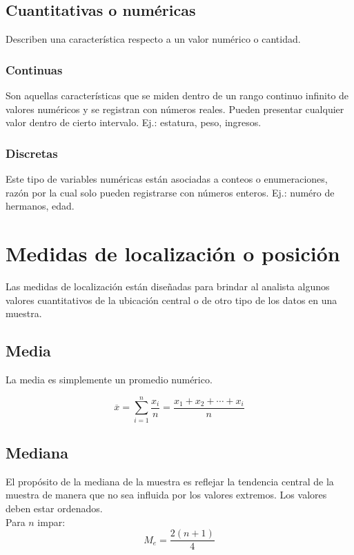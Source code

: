 \documentclass{report}
\begin{document}
      \subsection*{Cuantitativas o numéricas}
        Describen una característica respecto a un valor numérico o cantidad.

        \subsubsection*{Continuas}
          Son aquellas características que se miden dentro de un rango continuo 
          infinito de valores numéricos y se registran con números reales. Pueden 
          presentar cualquier valor dentro de cierto intervalo. Ej.: estatura, 
          peso, ingresos.
        \subsubsection*{Discretas}
          Este tipo de variables numéricas están asociadas a conteos o enumeraciones, 
          razón por la cual solo pueden registrarse con números enteros. Ej.: numéro
          de hermanos, edad.
    \section*{Medidas de localización o posición}
      Las medidas de localización están diseñadas para brindar al analista algunos 
      valores cuantitativos de la ubicación central o de otro tipo de los datos en una 
      muestra.
      
      \subsection*{Media}
        La media es simplemente un promedio numérico.

        \begin{equation*}
          \overline{x}=\sum_{i = 1}^n\frac{x_i}{n}=\frac{x_1+x_2+\dotsm+x_i}{n}
        \end{equation*}

        \subsection*{Mediana}
          El propósito de la mediana de la muestra es reflejar la tendencia central 
          de la muestra de manera que no sea influida por los valores extremos. Los
          valores deben estar ordenados.\\
          \indent Para $n$ impar:
          \begin{equation*}
            M_e=\frac{2(n+1)}{4}
          \end{equation*}
\end{document}
